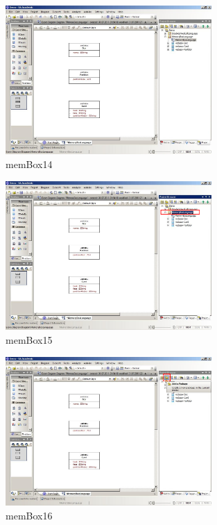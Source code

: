 \begin{figure}[!h]
	\centering
  \includegraphics[width=0.7\textwidth]{pics/memBox14.png}
	\caption{memBox14}
	\label{memBox14}
\end{figure}

\begin{figure}[!h]
	\centering
  \includegraphics[width=0.7\textwidth]{pics/memBox15.png}
	\caption{memBox15}
	\label{memBox15}
\end{figure}

\begin{figure}[!h]
	\centering
  \includegraphics[width=0.7\textwidth]{pics/memBox16.png}
	\caption{memBox16}
	\label{memBox16}
\end{figure}


